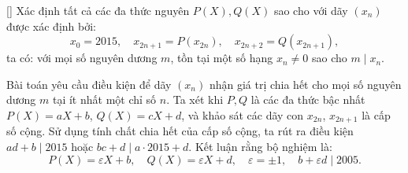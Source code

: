 \documentclass[../07-integer-polynomials.tex]{subfiles}
\begin{document}
\begin{example*}\label{example:FRA-2015-TST2-P4}[\textbf{}]
    Xác định tất cả các đa thức nguyên \( P(X), Q(X) \) sao cho với dãy \( (x_n) \) được xác định bởi:
    \[
        x_0 = 2015,\quad x_{2n+1} = P(x_{2n}),\quad x_{2n+2} = Q(x_{2n+1}),
    \]
    ta có: với mọi số nguyên dương \( m \), tồn tại một số hạng \( x_n \ne 0 \) sao cho \( m \mid x_n \).
\end{example*}

\begin{story*}
    Bài toán yêu cầu điều kiện để dãy \( (x_n) \) nhận giá trị chia hết cho mọi số nguyên dương \( m \) tại ít nhất một chỉ số \( n \).
    Ta xét khi \( P, Q \) là các đa thức bậc nhất \( P(X) = aX + b \), \( Q(X) = cX + d \), và khảo sát các dãy con \( x_{2n} \), \( x_{2n+1} \) là cấp số cộng.
    Sử dụng tính chất chia hết của cấp số cộng, ta rút ra điều kiện \( ad + b \mid 2015 \) hoặc \( bc + d \mid a \cdot 2015 + d \).
    Kết luận rằng bộ nghiệm là:
    \[
        P(X) = \varepsilon X + b,\quad Q(X) = \varepsilon X + d,\quad \varepsilon = \pm 1,\quad b + \varepsilon d \mid 2005.
    \]
\end{story*}
\end{document}

